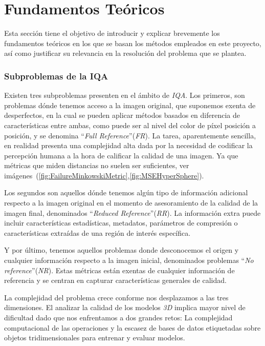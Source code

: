 \chapter{Fundamentos Teóricos}
Esta sección tiene el objetivo de introducir y explicar brevemente los
fundamentos teóricos en los que se basan los métodos empleados en este
proyecto, así como justificar su relevancia en la resolución del problema que
se plantea.

\subsection{Subproblemas de la IQA}
Existen tres subproblemas presenten en el ámbito de \emph{IQA}. Los primeros, son problemas 
dónde tenemos acceso a la imagen original, que suponemos exenta de desperfectos, 
en la cual se pueden aplicar métodos basados en diferencia de características 
entre ambas, como puede ser al nivel del color de píxel posición a posición,
y se denomina ``\emph{Full Reference}''(\emph{FR}). 
La tarea, aparentemente sencilla, en realidad presenta una complejidad alta dada por 
la necesidad de codificar la percepción humana a la hora de calificar la calidad 
de una imagen\cite{WhyIsIQASoDifficult}. Ya que métricas que miden distancias no suelen ser suficientes, 
ver imágenes~(\ref{fig:FailureMinkowskiMetric},\ref{fig:MSEHyperSphere}).

 
Los segundos son aquellos dónde tenemos algún tipo de información adicional respecto 
a la imagen original en el momento de asesoramiento de la calidad de la imagen final,
denominados ``\emph{Reduced Reference}''(\emph{RR}). La información extra puede incluir características estadísticas, metadatos, parámetros 
de compresión o características extraídas de una región de interés específica.
 
Y por último, tenemos aquellos problemas donde desconocemos el origen y cualquier 
información respecto a la imagen inicial, denominados problemas ``\emph{No reference}''(\emph{NR}).
Estas métricas están exentas de cualquier información de referencia y se 
centran en capturar características generales de calidad. 


La complejidad del problema crece conforme nos desplazamos a las tres dimensiones. 
El analizar la calidad de los modelos \emph{3D} implica mayor nivel de dificultad 
dado que nos enfrentamos a dos grandes retos: La complejidad computacional 
de las operaciones y la escasez de bases de datos etiquetadas
sobre objetos tridimensionales para entrenar y evaluar modelos. 
 
